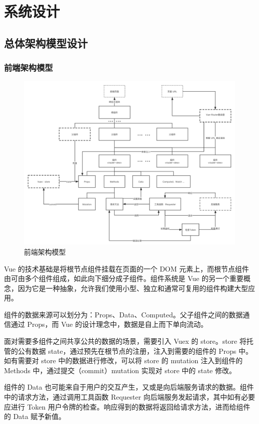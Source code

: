 \section{系统设计}
\subsection{总体架构模型设计}
\subsubsection{前端架构模型}
\begin{figure}[htb]
    \centering
    \includegraphics[width=\linewidth]{_images/前端模型.png}
    \caption{前端架构模型}
\end{figure}
Vue 的技术基础是将根节点组件挂载在页面的一个 DOM 元素上，而根节点组件由可由多个组件组成，如此向下细分成子组件。组件系统是 Vue 的另一个重要概念，因为它是一种抽象，允许我们使用小型、独立和通常可复用的组件构建大型应用。

组件的数据来源可以划分为：Props、Data、Computed。父子组件之间的数据通信通过 Props，而 Vue 的设计理念中，数据是自上而下单向流动。

面对需要多组件之间共享公共的数据的场景，需要引入 Vuex 的 store。store 将托管的公有数据 state，通过预先在根节点的注册，注入到需要的组件的 Props 中。如有需要对 store 中的数据进行修改，可以将 store 的 mutation 注入到组件的 Methods 中，通过提交（commit）mutation 实现对 store 中的 state 修改。

组件的 Data 也可能来自于用户的交互产生，又或是向后端服务请求的数据。组件中的请求方法，通过调用工具函数 Requester 向后端服务发起请求，其中如有必要应进行 Token 用户令牌的检查。响应得到的数据将返回给请求方法，进而给组件的 Data 赋予新值。

